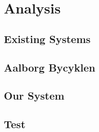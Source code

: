 


\setcounter{secnumdepth}{3}

\setcounter{page}{1}

\setcounter{tocdepth}{1}
\tableofcontents

\cleardoublepage


\chapter{Analysis}



\section{Existing Systems}


\section{Aalborg Bycyklen}


\section{Our System}


\section{Test}



\appendix





